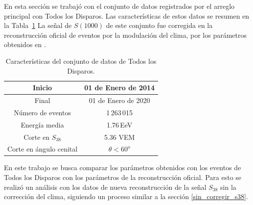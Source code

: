 
En esta sección se trabajó con el conjunto de datos registrados por el arreglo principal con Todos los Disparos. Las características de estos datos se resumen en la Tabla~\ref{tabla:caracteristicas_ALL} La señal de $S(1000)$ de este conjunto fue corregida en la reconstrucción oficial de eventos por la modulación del clima, por los parámetros obtenidos en \cite{aab2017impact}.

\begin{table}[H]
  \centering
  \begin{tabular}{|c|c|}
  \hline
  Inicio              & 01  de Enero de 2014\\ \hline
  Final               & 01  de Enero de 2020       							\\ \hline
  Número de eventos   & 1\,263\,015							\\ \hline 
  Energía media       & 1.76\,EeV       				\\ \hline  %
  Corte en $S_{38}$   & 5.36 VEM        				\\ \hline 
  Corte en ángulo cenital		  & $\theta < 60^o$ 				\\ \hline
  \end{tabular}
\caption{Características del conjunto de datos de Todos los Disparos.} \label{tabla:caracteristicas_ALL}
\end{table}




En este trabajo se busca comparar los parámetros obtenidos con los eventos de Todos los Disparos con los parámetros de la reconstrucción oficial. Para esto se realizó un análisis con los datos de nueva reconstrucción de la señal $S_{38}$ sin la corrección del clima, siguiendo un proceso similar a la sección \ref{sin_corregir_s38}.

